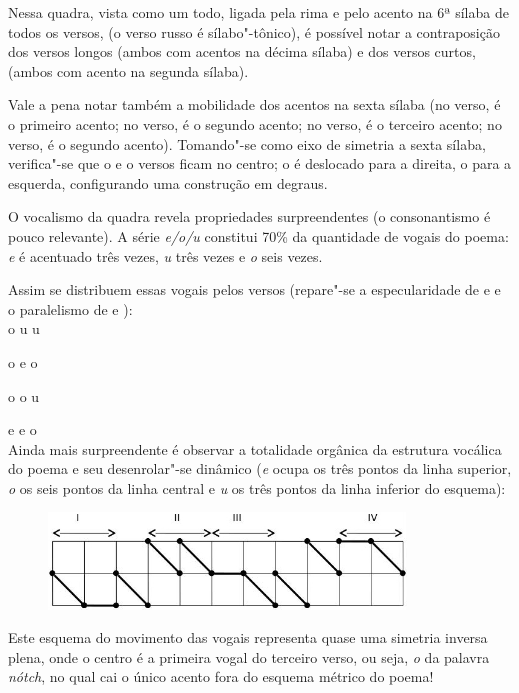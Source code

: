 Nessa quadra, vista como um todo, ligada pela rima  e pelo acento na
6ª sílaba de todos os versos, (o verso russo é sílabo"-tônico), é
possível notar a contraposição dos versos longos (ambos com acentos na
décima sílaba) e dos versos curtos, (ambos com acento na segunda
sílaba).

Vale a pena notar também a mobilidade dos acentos na sexta sílaba (no 
verso, é o primeiro acento; no  verso, é o segundo acento; no 
verso, é o terceiro acento; no  verso, é o segundo acento). Tomando"-se
como eixo de simetria a sexta sílaba, verifica"-se que o  e o  versos
ficam no centro; o  é deslocado para a direita, o  para a esquerda,
configurando uma construção em degraus.

O vocalismo da quadra revela propriedades surpreendentes (o
consonantismo é pouco relevante). A série \emph{e/o/u} constitui 70\% da
quantidade de vogais do poema: \emph{e} é acentuado três vezes, \emph{u}
três vezes e \emph{o} seis vezes.

Assim se distribuem essas vogais pelos versos (repare"-se a
especularidade de  e  e o paralelismo de  e ): \\

o u u

o e o

o o u

e e o \\

Ainda mais surpreendente é observar a totalidade orgânica da estrutura
vocálica do poema e seu desenrolar"-se dinâmico (\emph{e} ocupa os três
pontos da linha superior, \emph{o} os seis pontos da linha central e
\emph{u} os três pontos da linha inferior do esquema):

\begin{figure}[!ht]
\centering
  \includegraphics[width=95mm]{./imgs/fig5.jpg}
\end{figure}

Este esquema do movimento das vogais representa quase uma simetria
inversa plena, onde o centro é a primeira vogal do terceiro verso, ou
seja, \emph{o} da palavra \emph{nótch}, no qual cai o único
acento fora do esquema métrico do poema!

